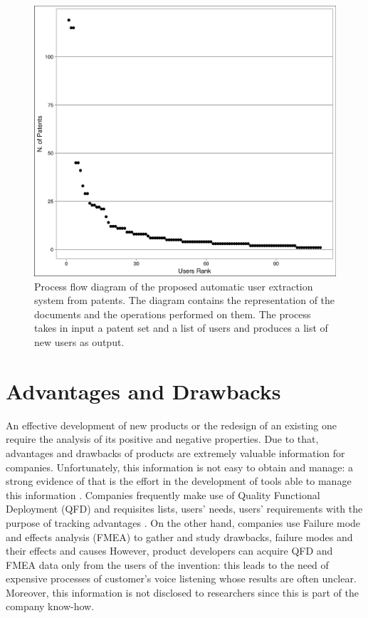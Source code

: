 \documentclass[]{book}
\begin{document}
\begin{figure}

{\centering \includegraphics[width=0.8\linewidth]{_bookdown_files/figures/user_rank} 

}

\caption{Process flow diagram of the proposed automatic user extraction system from patents. The diagram contains the representation of the documents and the operations performed on them. The process takes in input a patent set and a list of users and produces a list of new users as output.}\label{fig:patentsperuser}
\end{figure}

\section{Advantages and Drawbacks}\label{advdrwresults}

An effective development of new products or the redesign of an existing
one require the analysis of its positive and negative properties. Due to
that, advantages and drawbacks of products are extremely valuable
information for companies. Unfortunately, this information is not easy
to obtain and manage: a strong evidence of that is the effort in the
development of tools able to manage this information
\citep{pahl2013engineering, ulrich2003product}. Companies frequently
make use of Quality Functional Deployment (QFD) and requisites lists,
users' needs, users' requirements with the purpose of tracking
advantages \citep{carnevalli2008review}. On the other hand, companies
use Failure mode and effects analysis (FMEA) to gather and study
drawbacks, failure modes and their effects and causes
\citep{liu2013risk} However, product developers can acquire QFD and FMEA
data only from the users of the invention: this leads to the need of
expensive processes of customer's voice listening whose results are
often unclear. Moreover, this information is not disclosed to
researchers since this is part of the company know-how.
\end{document}
